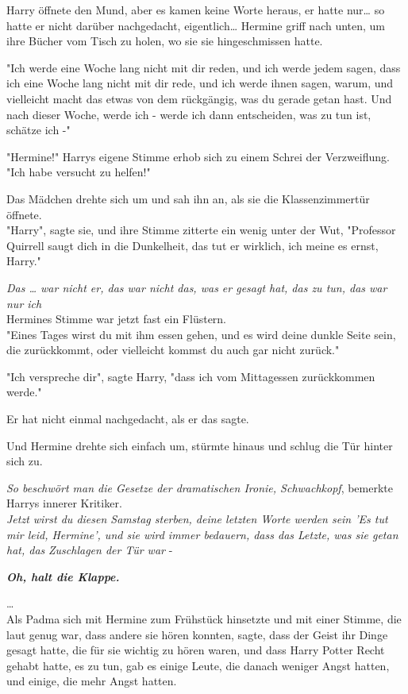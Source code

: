 {Harry öffnete den Mund, aber es kamen keine Worte heraus, er hatte nur… so hatte er nicht darüber nachgedacht, eigentlich… Hermine griff nach unten, um ihre Bücher vom Tisch zu holen, wo sie sie hingeschmissen hatte.

"Ich werde eine Woche lang nicht mit dir reden, und ich werde jedem sagen, dass ich eine Woche lang nicht mit dir rede, und ich werde ihnen sagen, warum, und vielleicht macht das etwas von dem rückgängig, was du gerade getan hast. Und nach dieser Woche, werde ich - werde ich dann entscheiden, was zu tun ist, schätze ich -"

"Hermine!" Harrys eigene Stimme erhob sich zu einem Schrei der Verzweiflung.\\ "Ich habe versucht zu helfen!"

Das Mädchen drehte sich um und sah ihn an, als sie die Klassenzimmertür öffnete.\\ "Harry", sagte sie, und ihre Stimme zitterte ein wenig unter der Wut, "Professor Quirrell saugt dich in die Dunkelheit, das tut er wirklich, ich meine es ernst, Harry."

\emph{Das … war nicht er, das war nicht das, was er gesagt hat, das zu tun, das war nur ich}\\ Hermines Stimme war jetzt fast ein Flüstern.\\ "Eines Tages wirst du mit ihm essen gehen, und es wird deine dunkle Seite sein, die zurückkommt, oder vielleicht kommst du auch gar nicht zurück."

"Ich verspreche dir", sagte Harry, "dass ich vom Mittagessen zurückkommen werde."

Er hat nicht einmal nachgedacht, als er das sagte.

Und Hermine drehte sich einfach um, stürmte hinaus und schlug die Tür hinter sich zu.

\emph{So beschwört man die Gesetze der dramatischen Ironie, Schwachkopf}, bemerkte Harrys innerer Kritiker.\\ \emph{Jetzt wirst du diesen Samstag sterben, deine letzten Worte werden sein 'Es tut mir leid, Hermine', und sie wird immer bedauern, dass das Letzte, was sie getan hat, das} \emph{Zuschlagen der Tür war} -

\textbf{\emph{Oh, halt die Klappe.}}

…\\ Als Padma sich mit Hermine zum Frühstück hinsetzte und mit einer Stimme, die laut genug war, dass andere sie hören konnten, sagte, dass der Geist ihr Dinge gesagt hatte, die für sie wichtig zu hören waren, und dass Harry Potter Recht gehabt hatte, es zu tun, gab es einige Leute, die danach weniger Angst hatten, und einige, die mehr Angst hatten.

}
